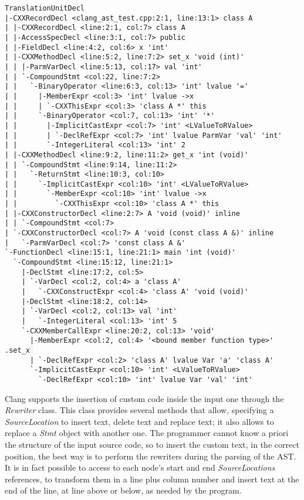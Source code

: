 \documentclass[a4paper,11pt,oneside]{book}
\begin{document}
\begin{lstlisting}[basicstyle=\color{gray}\scriptsize, keywordstyle=\color{black}, stringstyle=\color{ocra}]
TranslationUnitDecl
|-CXXRecordDecl <clang_ast_test.cpp:2:1, line:13:1> class A
| |-CXXRecordDecl <line:2:1, col:7> class A
| |-AccessSpecDecl <line:3:1, col:7> public
| |-FieldDecl <line:4:2, col:6> x 'int'
| |-CXXMethodDecl <line:5:2, line:7:2> set_x 'void (int)'
| | |-ParmVarDecl <line:5:13, col:17> val 'int'
| | `-CompoundStmt <col:22, line:7:2>
| |   `-BinaryOperator <line:6:3, col:13> 'int' lvalue '='
| |     |-MemberExpr <col:3> 'int' lvalue ->x
| |     | `-CXXThisExpr <col:3> 'class A *' this
| |     `-BinaryOperator <col:7, col:13> 'int' '*'
| |       |-ImplicitCastExpr <col:7> 'int' <LValueToRValue>
| |       | `-DeclRefExpr <col:7> 'int' lvalue ParmVar 'val' 'int'
| |       `-IntegerLiteral <col:13> 'int' 2
| |-CXXMethodDecl <line:9:2, line:11:2> get_x 'int (void)'
| | `-CompoundStmt <line:9:14, line:11:2>
| |   `-ReturnStmt <line:10:3, col:10>
| |     `-ImplicitCastExpr <col:10> 'int' <LValueToRValue>
| |       `-MemberExpr <col:10> 'int' lvalue ->x
| |         `-CXXThisExpr <col:10> 'class A *' this
| |-CXXConstructorDecl <line:2:7> A 'void (void)' inline
| | `-CompoundStmt <col:7>
| `-CXXConstructorDecl <col:7> A 'void (const class A &)' inline
|   `-ParmVarDecl <col:7> 'const class A &'
`-FunctionDecl <line:15:1, line:21:1> main 'int (void)'
  `-CompoundStmt <line:15:12, line:21:1>
    |-DeclStmt <line:17:2, col:5>
    | `-VarDecl <col:2, col:4> a 'class A'
    |   `-CXXConstructExpr <col:4> 'class A' 'void (void)'
    |-DeclStmt <line:18:2, col:14>
    | `-VarDecl <col:2, col:13> val 'int'
    |   `-IntegerLiteral <col:13> 'int' 5
    `-CXXMemberCallExpr <line:20:2, col:13> 'void'
      |-MemberExpr <col:2, col:4> '<bound member function type>' .set_x
      | `-DeclRefExpr <col:2> 'class A' lvalue Var 'a' 'class A'
      `-ImplicitCastExpr <col:10> 'int' <LValueToRValue>
        `-DeclRefExpr <col:10> 'int' lvalue Var 'val' 'int'
\end{lstlisting}


Clang supports the insertion of custom code inside the input one through the \emph{Rewriter} class. This class provides several methods that allow, specifying a \emph{SourceLocation} to insert text, delete text and replace text; it also allows to replace a \emph{Stmt} object with another one. The programmer cannot know a priori the structure of the input source code, so to insert the custom text, in the correct position, the best way is to perform the rewriters during the parsing of the AST. It is in fact possible to access to each node’s start and end \emph{SourceLocations} references, to transform them in a line plus column number and insert text at the end of the line, at line above or below, as needed by the program. 
\end{document}
